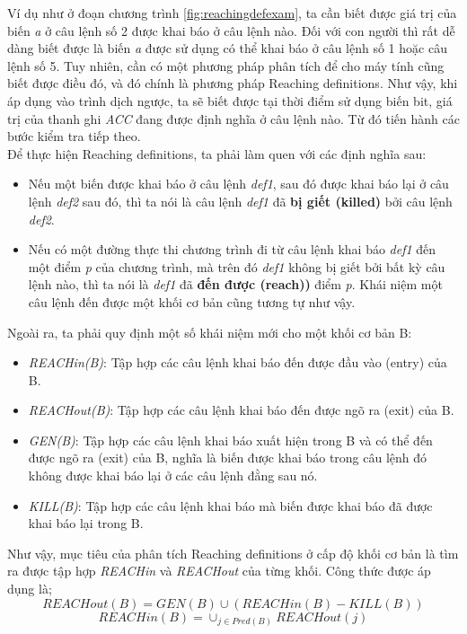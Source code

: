 Ví dụ như ở đoạn chương trình \ref{fig:reachingdefexam}, ta cần biết được giá trị của biến \textit{a} ở câu lệnh số 2 được khai báo ở câu lệnh nào. Đối với con người thì rất dễ dàng biết được là biến \textit{a} được sử dụng có thể khai báo ở câu lệnh số 1 hoặc câu lệnh số 5. Tuy nhiên, cần có một phương pháp phân tích để cho máy tính cũng biết được điều đó, và đó chính là phương pháp Reaching definitions. Như vậy, khi áp dụng vào trình dịch ngược, ta sẽ biết được tại thời điểm sử dụng biến bit, giá trị của thanh ghi \textit{ACC} đang được định nghĩa ở câu lệnh nào. Từ đó tiến hành các bước kiểm tra tiếp theo. \\

Để thực hiện Reaching definitions, ta phải làm quen với các định nghĩa sau:
\begin{itemize}
	\item Nếu một biến được khai báo ở câu lệnh \textit{def1}, sau đó được khai báo lại ở câu lệnh \textit{def2} sau đó, thì ta nói là câu lệnh \textit{def1} đã \textbf{bị giết (killed)} bởi câu lệnh \textit{def2}.
	\item Nếu có một đường thực thi chương trình đi từ câu lệnh khai báo \textit{def1} đến một điểm \textit{p} của chương trình, mà trên đó \textit{def1} không bị giết bởi bất kỳ câu lệnh nào, thì ta nói là \textit{def1} đã \textbf{đến được (reach))} điểm \textit{p}. Khái niệm một câu lệnh đến được một khối cơ bản cũng tương tự như vậy.
\end{itemize}

Ngoài ra, ta phải quy định một số khái niệm mới cho một khối cơ bản B:
\begin{itemize}
	\item \textit{REACHin(B)}: Tập hợp các câu lệnh khai báo đến được đầu vào (entry) của B.
	\item \textit{REACHout(B)}: Tập hợp các câu lệnh khai báo đến được ngõ ra (exit) của B.
	\item \textit{GEN(B)}: Tập hợp các câu lệnh khai báo xuất hiện trong B và có thể đến được ngõ ra (exit) của B, nghĩa là biến được khai báo trong câu lệnh đó không được khai báo lại ở các câu lệnh đằng sau nó.
	\item \textit{KILL(B)}: Tập hợp các câu lệnh khai báo mà biến được khai báo đã được khai báo lại trong B.
\end{itemize}

Như vậy, mục tiêu của phân tích Reaching definitions ở cấp độ khối cơ bản là tìm ra được tập hợp \textit{REACHin} và \textit{REACHout} của từng khối. Công thức được áp dụng là;
\begin{equation} \label{eq:reachout}
	REACHout(B) = GEN(B) \cup (REACHin(B)-KILL(B))
\end{equation}	
\begin{equation} \label{eq:reachin}
REACHin(B) = \cup_{j \in Pred(B)} REACHout(j)
\end{equation}	

